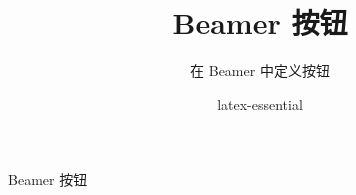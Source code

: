 \documentclass{ctexbeamer}
\title{Beamer 按钮}
\subtitle{在 Beamer 中定义按钮}
\author{latex-essential}
\begin{document}
\begin{frame}
  \label{first}
  \titlepage
\end{frame}

\begin{frame}{Beamer 按钮}
  \hyperlink{first}{}

  \hyperlink{first}{}

  \hyperlink{first}{}
  
  \hyperlink{first}{}
\end{frame}
\end{document}
